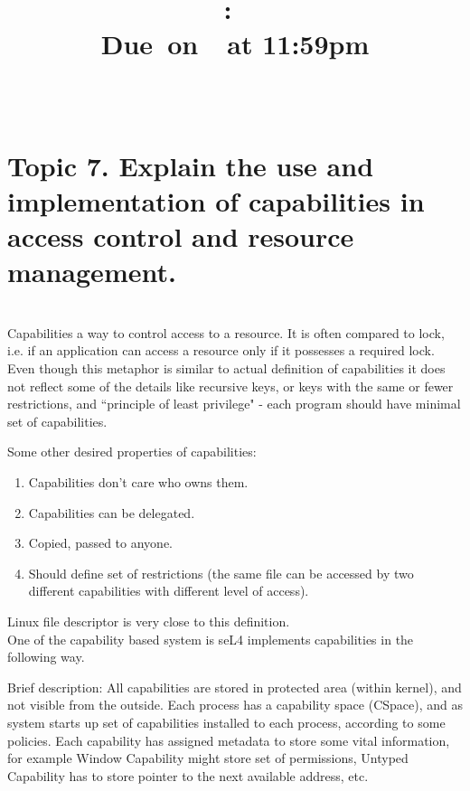 \documentclass{article}
\title{
    \vspace{2in}
    \textmd{\textbf{\hmwkClass:\ \hmwkTitle}}\\
        \normalsize\vspace{0.1in}\small{Due\ on\ \hmwkDueDate\ at 11:59pm}\\
        \vspace{0.1in}\large{\textit{\hmwkClassInstructor\ \hmwkClassTime}}
    \vspace{3in}
}
\author{\textbf{\hmwkAuthorName}}
\date{}
\begin{document}
\maketitle

\pagebreak

        \section{Topic 7. Explain the use and implementation of capabilities in access control and resource
        management.}\\

        Capabilities a way to control access to a resource. It is often compared to lock, i.e. if an
        application can access a resource only if it possesses a required lock. Even though this metaphor is
        similar to actual definition of capabilities it does not reflect some of the details like recursive
        keys, or keys with the same or fewer restrictions, and ``principle of least privilege"  -
        each program should have minimal set of capabilities.

        Some other desired properties of capabilities:
        \begin{enumerate}[$\bullet$]
            \item Capabilities don't care who owns them.
            \item Capabilities can be delegated.
            \item Copied, passed to anyone.
            \item Should define set of restrictions (the same file can be accessed by two different
                capabilities with different level of access).
        \end{enumerate}

        Linux file descriptor is very close to this definition.\\

        One of the capability based system is seL4 implements capabilities in the following way. 

        Brief description:
        All capabilities are stored in protected area (within kernel), and not visible from the outside. Each
        process has a capability space (CSpace), and  as system starts up set of capabilities installed to each process,
        according to some policies. Each capability has assigned metadata to store some vital information,
        for example Window Capability might store set of permissions, Untyped Capability has to store pointer
        to the next available address, etc.
\end{document}
